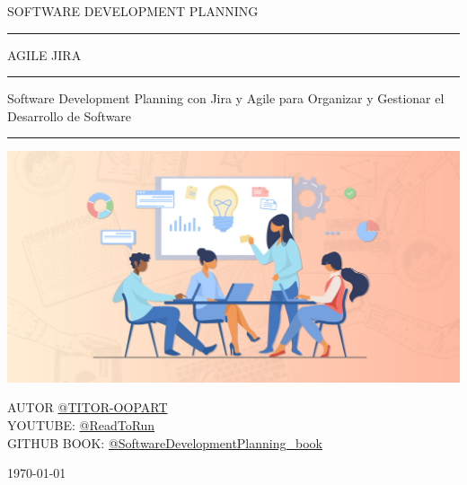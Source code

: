 \begin{titlepage}
	\noindent
	\centering
	\Large {SOFTWARE DEVELOPMENT PLANNING}
	\begin{center}
		\centering
		\rule{150 mm}{0.1 mm}
		\Large {AGILE JIRA\\}
		
		\rule{150 mm}{0.1 mm}
		\large {{Software Development Planning con Jira y Agile para Organizar y Gestionar el Desarrollo de Software}}
		\rule{150 mm}{0.4 mm}
		\vspace{1 cm}
		\vspace{0.3 cm}
		\includegraphics[width=1\textwidth]{image/cover.jpg}
	\end{center}
	\vspace{0.3 cm}
	\begin{center}
		{\large AUTOR
			{\href{https://github.com/titoroopart}{@TITOR-OOPART}}}	\\
		{\large YOUTUBE:	{\href{https://www.youtube.com/@ReadToRun}{@ReadToRun}}}	\\
		{\large GITHUB BOOK:  	{\href{https://github.com/titoroopart/SoftwareDevelopmentPlanning_book#}{@SoftwareDevelopmentPlanning\_book}}}\\
	\end{center}
	\vspace{0.5 cm}
	\vfill
	\begin{center}
		\large\today
	\end{center}
\end{titlepage}
